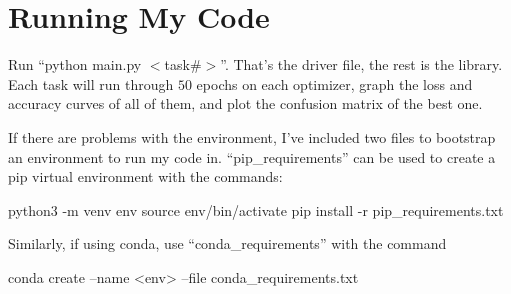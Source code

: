 \documentclass[12pt]{article}
\begin{document}
\section{Running My Code}

Run ``python main.py $<$task\#$>$''. That's the driver file, the rest is the library.
Each task will run through $50$ epochs on each optimizer, graph the loss and accuracy curves of all of them, and
 plot the confusion matrix of the best one.

If there are problems with the environment, I've included two files to
 bootstrap an environment to run my code in.
``pip\_requirements'' can be used to create a pip virtual environment with
 the commands:
\begin{python}
  python3 -m venv env
  source env/bin/activate
  pip install -r pip_requirements.txt
\end{python}
Similarly, if using conda, use ``conda\_requirements'' with the command
\begin{python}
  conda create --name <env> --file conda_requirements.txt
\end{python}


\end{document}
